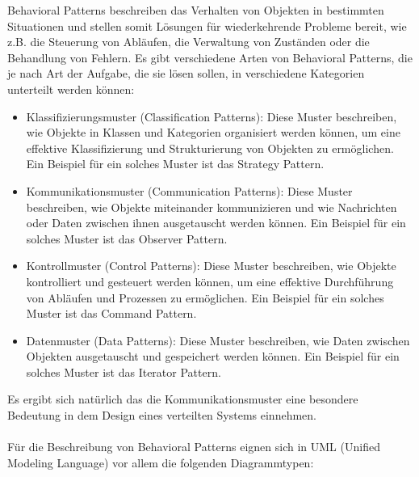 Behavioral Patterns beschreiben das Verhalten von Objekten in bestimmten Situationen und stellen somit Lösungen für wiederkehrende Probleme bereit, wie z.B. die Steuerung von Abläufen, die Verwaltung von Zuständen oder die Behandlung von Fehlern. Es gibt verschiedene Arten von Behavioral Patterns, die je nach Art der Aufgabe, die sie lösen sollen, in verschiedene Kategorien unterteilt werden können:
\begin{itemize}
\item Klassifizierungsmuster (Classification Patterns): Diese Muster beschreiben, wie Objekte in Klassen und Kategorien organisiert werden können, um eine effektive Klassifizierung und Strukturierung von Objekten zu ermöglichen. Ein Beispiel für ein solches Muster ist das Strategy Pattern.
\item Kommunikationsmuster (Communication Patterns): Diese Muster beschreiben, wie Objekte miteinander kommunizieren und wie Nachrichten oder Daten zwischen ihnen ausgetauscht werden können. Ein Beispiel für ein solches Muster ist das Observer Pattern.
\item Kontrollmuster (Control Patterns): Diese Muster beschreiben, wie Objekte kontrolliert und gesteuert werden können, um eine effektive Durchführung von Abläufen und Prozessen zu ermöglichen. Ein Beispiel für ein solches Muster ist das Command Pattern.
\item Datenmuster (Data Patterns): Diese Muster beschreiben, wie Daten zwischen Objekten ausgetauscht und gespeichert werden können. Ein Beispiel für ein solches Muster ist das Iterator Pattern.
\end{itemize}
Es ergibt sich natürlich das die Kommunikationsmuster eine besondere Bedeutung in dem Design eines verteilten Systems einnehmen. 
\\\\
Für die Beschreibung von Behavioral Patterns eignen sich in UML (Unified Modeling Language) vor allem die folgenden Diagrammtypen:
